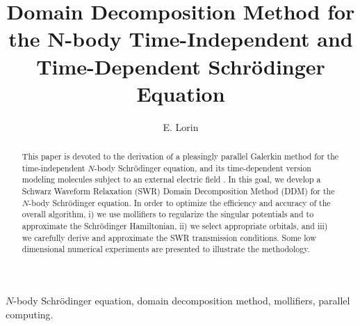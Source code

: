 \documentclass[11pt]{elsarticle}
\renewcommand{\thefootnote}{\arabic{footnote}}
\begin{document}
\begin{frontmatter}


\title{Domain Decomposition Method for the N-body Time-Independent and Time-Dependent Schr\"odinger Equation} 


\author[carl,crm]{E. Lorin}

\address[carl]{School of Mathematics and Statistics, Carleton University, Ottawa, Canada, K1S 5B6}
\address[crm]{Centre de Recherches Math\'{e}matiques, Universit\'{e} de Montr\'{e}al, Montr\'{e}al, Canada, H3T~1J4}



\renewcommand{\thefootnote}{\arabic{footnote}}


\begin{abstract}
This paper is devoted to the derivation of a pleasingly parallel Galerkin method for the time-independent $N$-body Schr\"odinger equation, and its time-dependent version modeling molecules subject to an external electric field \cite{BAN,gauge,CCT}.  In this goal, we develop a Schwarz Waveform Relaxation (SWR) Domain Decomposition Method (DDM) for the $N$-body Schr\"odinger equation. In order to optimize the efficiency and accuracy of the overall algorithm, i) we use mollifiers to regularize the singular potentials and to approximate the Schr\"odinger Hamiltonian, ii) we select appropriate orbitals, and iii) we carefully derive and approximate the SWR transmission conditions. Some low dimensional numerical experiments are presented to illustrate the methodology.
\end{abstract}

\begin{keyword} $N$-body Schr\"odinger equation, domain decomposition method, mollifiers, parallel computing.
\end{keyword}


\end{frontmatter}
\tableofcontents
\end{document}
